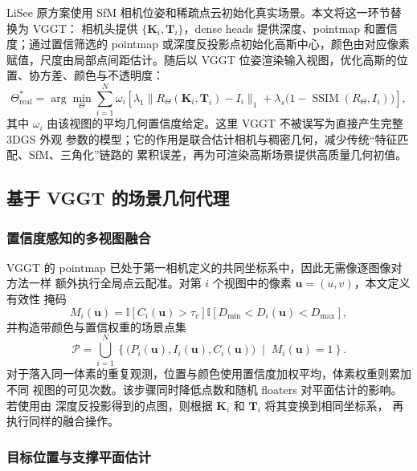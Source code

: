 LiSee 原方案使用 SfM 相机位姿和稀疏点云初始化真实场景。本文将这一环节替换为 VGGT：
相机头提供 $\{\mathbf K_i,\mathbf T_i\}$，dense heads 提供深度、pointmap 和置信度；通过置信筛选的
pointmap 或深度反投影点初始化高斯中心，颜色由对应像素赋值，尺度由局部点间距估计。随后以
VGGT 位姿渲染输入视图，优化高斯的位置、协方差、颜色与不透明度：
\begin{equation}
  \Theta_{\mathrm{real}}^{*}=\arg\min_{\Theta}
  \sum_{i=1}^{N}\omega_i\left[
  \lambda_1\|R_{\Theta}(\mathbf K_i,\mathbf T_i)-I_i\|_1
  +\lambda_s\bigl(1-\operatorname{SSIM}(R_{\Theta},I_i)\bigr)
  \right],
\end{equation}
其中 $\omega_i$ 由该视图的平均几何置信度给定。这里 VGGT 不被误写为直接产生完整 3DGS 外观
参数的模型；它的作用是联合估计相机与稠密几何，减少传统“特征匹配、SfM、三角化”链路的
累积误差，再为可渲染高斯场景提供高质量几何初值。

\subsection{基于 VGGT 的场景几何代理}

\subsubsection{置信度感知的多视图融合}

VGGT 的 pointmap 已处于第一相机定义的共同坐标系中，因此无需像逐图像对方法一样
额外执行全局点云配准。对第 $i$ 个视图中的像素 $\mathbf{u}=(u,v)$，本文定义有效性
掩码
\begin{equation}
  M_i(\mathbf{u})=
  \mathbb{I}\!\left[C_i(\mathbf{u})>\tau_c\right]
  \mathbb{I}\!\left[D_{\min}<D_i(\mathbf{u})<D_{\max}\right],
\end{equation}
并构造带颜色与置信权重的场景点集
\begin{equation}
  \mathcal{P}
  =\bigcup_{i=1}^{N}
  \left\{
  \big(P_i(\mathbf{u}),I_i(\mathbf{u}),C_i(\mathbf{u})\big)
  \;\middle|\;M_i(\mathbf{u})=1
  \right\}.
\end{equation}
对于落入同一体素的重复观测，位置与颜色使用置信度加权平均，体素权重则累加不同
视图的可见次数。该步骤同时降低点数和随机 floaters 对平面估计的影响。若使用由
深度反投影得到的点图，则根据 $\mathbf{K}_i$ 和 $\mathbf{T}_i$ 将其变换到相同坐标系，
再执行同样的融合操作。

\subsubsection{目标位置与支撑平面估计}

